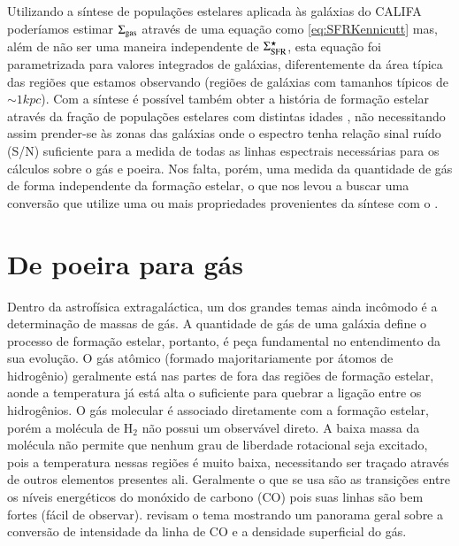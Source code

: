 Utilizando a síntese de populações estelares aplicada às galáxias do CALIFA poderíamos estimar
$\Sigma_{\mathrm{gas}}$ através de uma equação como \eqref{eq:SFRKennicutt} mas, além de não ser uma maneira
independente de $\Sigma_{\mathrm{SFR}}^\star$, esta equação foi parametrizada para valores integrados de galáxias,
diferentemente da área típica das regiões que estamos observando (regiões de galáxias com tamanhos
típicos de $\sim 1 kpc$). Com a síntese é possível também obter a história de formação estelar
através da fração de populações estelares com distintas idades \citep{Asari.etal.2007a}, não necessitando assim
prender-se às zonas das galáxias onde o espectro tenha relação sinal ruído (S/N) suficiente para a
medida de todas as linhas espectrais necessárias para os cálculos sobre o gás e poeira. Nos
falta, porém, uma medida da quantidade de gás de forma independente da formação estelar, o que nos
levou a buscar uma conversão que utilize uma ou mais propriedades provenientes da síntese com o
\starlight.

\section{De poeira para gás}
\label{sec:intro:dust2gas}

Dentro da astrofísica extragaláctica, um dos grandes temas ainda incômodo é a determinação de massas
de gás. A quantidade de gás de uma galáxia define o processo de formação estelar, portanto, é peça
fundamental no entendimento da sua evolução. O gás atômico (formado majoritariamente por átomos de
hidrogênio) geralmente está nas partes de fora das regiões de formação estelar, aonde a temperatura
já está alta o suficiente para quebrar a ligação entre os hidrogênios. O gás molecular é associado
diretamente com a formação estelar, porém a molécula de $\mathrm{H}_2$ não possui um observável
direto. A baixa massa da molécula não permite que nenhum grau de liberdade rotacional seja excitado,
pois a temperatura nessas regiões é muito baixa, necessitando ser traçado através de outros
elementos presentes ali. Geralmente o que se usa são as transições entre os níveis energéticos do
monóxido de carbono (CO) pois suas linhas são bem fortes (fácil de observar).
\citet{Bolatto.etal.2013a} revisam o tema mostrando um panorama geral sobre a conversão de
intensidade da linha de CO e a densidade superficial do gás.

